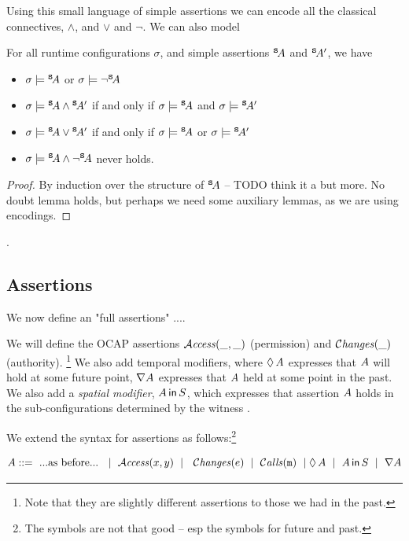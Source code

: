 Using this small language of simple assertions we can encode all the classical connectives, \ie $\wedge$, and $\vee$ and $\neg$. We can also model


\begin{lemma}
For all runtime configurations $\sigma$, and simple assertions ${^{\small{{\mbox{\tt{s}}}}}\! A}$ and ${^{\small{{\mbox{\tt{s}}}}}\! A'}$, we have
\begin{itemize}
\item
$\sigma \models {^{\small{{\mbox{\tt{s}}}}}\! A}$ or $\sigma \models \neg{^{\small{{\mbox{\tt{s}}}}}\! A}$
\item
$\sigma \models {^{\small{{\mbox{\tt{s}}}}}\! A} \wedge {^{\small{{\mbox{\tt{s}}}}}\! A'}$ \SP if and only if \SP $\sigma \models {^{\small{{\mbox{\tt{s}}}}}\! A}$ and  $\sigma \models {^{\small{{\mbox{\tt{s}}}}}\! A'}$ 
\item
$\sigma \models {^{\small{{\mbox{\tt{s}}}}}\! A} \vee {^{\small{{\mbox{\tt{s}}}}}\! A'}$ \SP if and only if \SP $\sigma \models {^{\small{{\mbox{\tt{s}}}}}\! A}$ or  $\sigma \models {^{\small{{\mbox{\tt{s}}}}}\! A'}$ 
\item
$\sigma \models {^{\small{{\mbox{\tt{s}}}}}\! A} \wedge \neg{^{\small{{\mbox{\tt{s}}}}}\! A}$ never holds.
\end{itemize}
\end{lemma}
\begin{proof} By induction over the structure of ${^{\small{{\mbox{\tt{s}}}}}\! A}$ -- TODO think it a but more. No doubt lemma holds, 
but perhaps we need some auxiliary lemmas, as we are using encodings. \end{proof}.
 
 \subsection{Assertions}

We now define an "full assertions" ....

We will define the OCAP assertions ${\mathcal{A}}\textrm{\textit{ccess}}(\_,\_)$  (permission)
and   $\mathcal{C}\textrm{\textit{hanges}}(\_)$ (authority). \footnote{Note that they are slightly different
assertions to those we had in the past.}
We also add temporal modifiers, where $\lozenge\, A$ expresses that $A$ will hold at some future point,
$\nabla A$ expresses that $A$ held at some point in the past.
We also add a {\em spatial modifier}, $A\,{\bf{\sf {in}}}\, S$, which expresses that assertion $A$ holds in
the sub-configurations determined by the witness .

We extend the syntax for assertions as follows:\footnote{The symbols are not that good -- esp the symbols for future and past.}

\begin{definition}[Assertions]
$$\A ::=\  ... \mbox{as before} ...\ \ \mid \ \CanAccess x y \ \mid\  \ \Changes e \ \mid\  \Calls{m} \ \mid\  \\ \Future \A \ \mid \ \Using \A S  \ \mid \  \Past \A$$
\end{definition}\M



